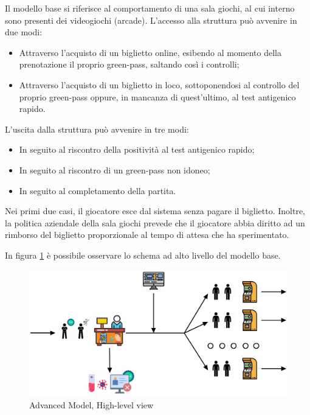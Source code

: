 \documentclass{article}
\begin{document}
Il modello base si riferisce al comportamento di una sala giochi, al cui interno sono presenti dei videogiochi (arcade). L'accesso alla struttura può avvenire in due modi:
\begin{itemize}
\item Attraverso l'acquisto di un biglietto online, esibendo al momento della prenotazione il proprio green-pass, saltando così i controlli;
\item Attraverso l'acquisto di un biglietto in loco, sottoponendosi al controllo del proprio green-pass oppure, in mancanza di quest'ultimo, al test antigenico rapido. 
\end{itemize}
L'uscita dalla struttura può avvenire in tre modi:
\begin{itemize}
\item In seguito al riscontro della positività al test antigenico rapido;
\item In seguito al riscontro di un green-pass non idoneo;
\item In seguito al completamento della partita.
\end{itemize}
Nei primi due casi, il giocatore esce dal sistema senza pagare il biglietto.
Inoltre, la politica aziendale della sala giochi prevede che il giocatore abbia diritto ad un rimborso del biglietto proporzionale al tempo di attesa che ha sperimentato.
\par In figura \ref{figura:base_model_high_level} è possibile osservare lo schema ad alto livello del modello base.
\begin{figure}[H]
	\centering
	\captionsetup{justification=centering,margin=2cm}
	\includegraphics[scale=0.75]{images/base_model_high_level.jpg}
	\caption{Advanced Model, High-level view}\label{figura:base_model_high_level}
\end{figure}


\end{document}
